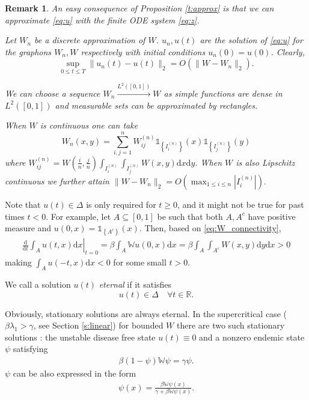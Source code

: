 \documentclass{article}
\renewcommand{\d}{\mathrm{d}}
\newcommand{\W}{\mathbb{W}}
\newcommand{\1}[1]{{\mathds{1}}_{\left\{#1\right\}}}
\newtheorem{remark}{Remark}
\newcommand{\rem}[1]{{#1}}
\begin{document}
\rem{
\begin{remark}
\label{r:discrete}
An easy consequence of Proposition \ref{t:approx} is that we can approximate \eqref{eq:u} with the finite ODE system \eqref{eq:z}.

Let $W_n$ be a discrete approximation of $W$. $u_n,u(t)$ are the solution of \eqref{eq:u} for the graphons $W_n,W$ respectively with initial conditions $u_n(0)=u(0)$. Clearly,
$$\sup_{0 \leq t \leq T} \|u_n(t)-u(t) \|_2=O \left(\|W-W_n\|_2 \right).$$

We can choose a sequence $W_n \overset{L^2([0,1])}{ \to} W$ as simple functions are dense in $L^2([0,1])$ and measurable sets can be approximated by rectangles.

When $W$ is continuous one can take $$W_n(x,y)=\sum_{i,j=1}^n W_{ij}^{(n)}\1{I_i^{(n)}}(x)\1{I_j^{(n)}}(y)$$
where $W_{ij}^{(n)}=W \left(\frac{i}{n},\frac{j}{n}\right) \int_{I_i^{(n)}}\int_{I_j^{(n)}}W(x,y) \d x \d y$. When $W$ is also Lipschitz continuous we further attain $\|W-W_n\|_2 =O \left( \max_{1 \leq i \leq n} \left|I_i^{(n)}\right| \right).$    

\end{remark}
}
Note that  $u(t) \in \Delta$ is only required for $t\geq 0$, and it might not be true for past times $t<0$. For example, let $A \subseteq [0,1]$ be such that both $A,A^c$ have positive measure and $u(0,x)=\1{A^c}(x).$ Then, based on \eqref{eq:W_connectivity},
\begin{align*}
\left.\frac{\d}{\d t} \int_{A}u(t,x) \d x \right |_{t=0}=\beta \int_{A} \W u(0,x) \d x=\beta \int_{A} \int_{A^c} W(x,y) \d y \d x>0
\end{align*}
making $\int_{A}u(-t,x) \d x<0$ for some small $t > 0.$

We call a solution $u(t)$ \emph{eternal} if it satisfies
$$u(t) \in \Delta\quad \forall t \in \mathbb{R}.$$

Obviously, stationary solutions are always eternal. In the supercritical case ($\beta \lambda_1>\gamma$, see Section \ref{s:linear}) for bounded $W$ there are two such stationary solutions \cite[Proposition 4.13.]{SISdyn}: the unstable disease free state $u(t) \equiv 0$ and a nonzero endemic state $\psi$ satisfying
\begin{align}
\label{eq:psi}
\beta(1-\psi)\W \psi=\gamma \psi.
\end{align}
$\psi$ can be also expressed in the form
\begin{align*}
	\psi(x)=\frac{\beta \W \psi(x)}{\gamma+\beta \W \psi(x)}.
\end{align*}
\end{document}
